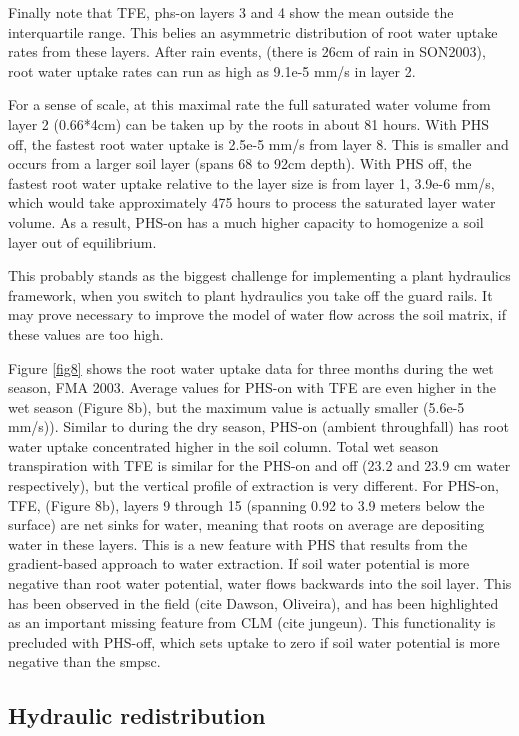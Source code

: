 \documentclass[draft,linenumbers]{agujournal}
\begin{document}
Finally note that TFE, phs-on layers 3 and 4 show the mean outside the interquartile range. 
This belies an asymmetric distribution of root water uptake rates from these layers.
After rain events, (there is 26cm of rain in SON2003), root water uptake rates can run as high as 9.1e-5 mm/s in layer 2.

For a sense of scale, at this maximal rate the full saturated water volume from layer 2 (0.66*4cm) can be taken up by the roots in about 81 hours.
With PHS off, the fastest root water uptake is 2.5e-5 mm/s from layer 8. This is smaller and occurs from a larger soil layer (spans 68 to 92cm depth).
With PHS off, the fastest root water uptake relative to the layer size is from layer 1, 3.9e-6 mm/s, 
which would take approximately 475 hours to process the saturated layer water volume. 
As a result, PHS-on has a much higher capacity to homogenize a soil layer out of equilibrium. 

This probably stands as the biggest challenge for implementing a plant hydraulics framework, 
when you switch to plant hydraulics you take off the guard rails. 
It may prove necessary to improve the model of water flow across the soil matrix, if these values are too high.

Figure \ref{fig8} shows the root water uptake data for three months during the wet season, FMA 2003. 
Average values for PHS-on with TFE are even higher in the wet season (Figure 8b), but the maximum value is actually smaller (5.6e-5 mm/s)).
Similar to during the dry season, PHS-on (ambient throughfall) has root water uptake concentrated higher in the soil column.
Total wet season transpiration with TFE is similar for the PHS-on and off (23.2 and 23.9 cm water respectively), 
but the vertical profile of extraction is very different.
For PHS-on, TFE, (Figure 8b), layers 9 through 15 (spanning 0.92 to 3.9 meters below the surface) are net sinks for water,
meaning that roots on average are depositing water in these layers.
This is a new feature with PHS that results from the gradient-based approach to water extraction. 
If soil water potential is more negative than root water potential, water flows backwards into the soil layer.
This has been observed in the field (cite Dawson, Oliveira), and has been highlighted as an important missing feature from CLM (cite jungeun).
This functionality is precluded with PHS-off, which sets uptake to zero if soil water potential is more negative than the smpsc. 



\subsection{Hydraulic redistribution}
\end{document}
